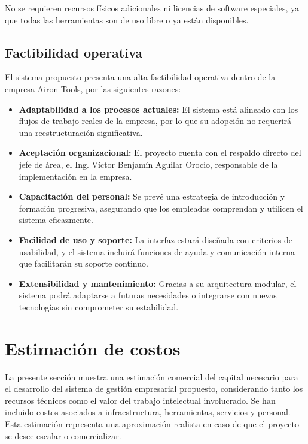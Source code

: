 No se requieren recursos físicos adicionales ni licencias de software especiales, ya que todas las herramientas son de uso libre o ya están disponibles.

\subsection{Factibilidad operativa}

El sistema propuesto presenta una alta factibilidad operativa dentro de la empresa Airon Tools, por las siguientes razones:

\begin{itemize}
	\item \textbf{Adaptabilidad a los procesos actuales:} El sistema está alineado con los flujos de trabajo reales de la empresa, por lo que su adopción no requerirá una reestructuración significativa.
	
	\item \textbf{Aceptación organizacional:} El proyecto cuenta con el respaldo directo del jefe de área, el Ing. Víctor Benjamín Aguilar Orocio, responsable de la implementación en la empresa.
	
	\item \textbf{Capacitación del personal:} Se prevé una estrategia de introducción y formación progresiva, asegurando que los empleados comprendan y utilicen el sistema eficazmente.
	
	\item \textbf{Facilidad de uso y soporte:} La interfaz estará diseñada con criterios de usabilidad, y el sistema incluirá funciones de ayuda y comunicación interna que facilitarán su soporte continuo.
	
	\item \textbf{Extensibilidad y mantenimiento:} Gracias a su arquitectura modular, el sistema podrá adaptarse a futuras necesidades o integrarse con nuevas tecnologías sin comprometer su estabilidad.
\end{itemize}

\vspace{0.5cm}
\section{Estimación de costos}

La presente sección muestra una estimación comercial del capital necesario para el desarrollo del sistema de gestión empresarial propuesto, considerando tanto los recursos técnicos como el valor del trabajo intelectual involucrado. Se han incluido costos asociados a infraestructura, herramientas, servicios y personal. Esta estimación representa una aproximación realista en caso de que el proyecto se desee escalar o comercializar.

